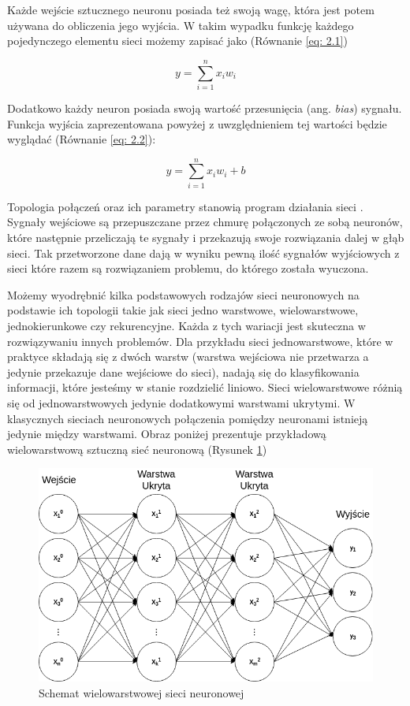 \documentclass[12pt, oneside, a4paper]{report}
\begin{document}
Każde wejście sztucznego neuronu posiada też swoją wagę, która jest potem używana do obliczenia jego wyjścia. W takim wypadku funkcję każdego pojedynczego elementu sieci możemy zapisać jako (Równanie \ref{eq: 2.1})

\begin{equation}\label{eq: 2.1}
y = \sum^{n}_{i=1} x_{i}w_{i}
\end{equation}

Dodatkowo każdy neuron posiada swoją wartość przesunięcia (ang. \textit{bias}) sygnału. Funkcja wyjścia zaprezentowana powyżej z uwzględnieniem tej wartości będzie wyglądać (Równanie \ref{eq: 2.2}):

\begin{equation}\label{eq: 2.2}
  y = \sum^{n}_{i=1} x_{i}w_{i} + b
\end{equation}

Topologia połączeń oraz ich parametry stanowią program działania sieci \citep{tadeusiewicz1993sieci}. Sygnały wejściowe są przepuszczane przez chmurę połączonych ze sobą neuronów, które następnie przeliczają te sygnały i przekazują swoje rozwiązania dalej w głąb sieci. Tak przetworzone dane dają w wyniku pewną ilość sygnałów wyjściowych z sieci które razem są rozwiązaniem problemu, do którego została wyuczona.

Możemy wyodrębnić kilka podstawowych rodzajów sieci neuronowych na podstawie ich topologii takie jak sieci jedno warstwowe, wielowarstwowe, jednokierunkowe czy rekurencyjne. Każda z tych wariacji jest skuteczna w rozwiązywaniu innych problemów. Dla przykładu sieci jednowarstwowe, które w praktyce składają się z dwóch warstw (warstwa wejściowa nie przetwarza a jedynie przekazuje dane wejściowe do sieci), nadają się do klasyfikowania informacji, które jesteśmy w stanie rozdzielić liniowo. Sieci wielowarstwowe różnią się od jednowarstwowych jedynie dodatkowymi warstwami ukrytymi. W klasycznych sieciach neuronowych połączenia pomiędzy neuronami istnieją jedynie między warstwami. Obraz poniżej prezentuje przykładową wielowarstwową sztuczną sieć neuronową (Rysunek \ref{fig: 2.2})

\begin{figure}[h]
	\centering
	\includegraphics[width=12cm]{fig212.png}
	\caption{Schemat wielowarstwowej sieci neuronowej}
	\label{fig: 2.2}
\end{figure}
\end{document}
